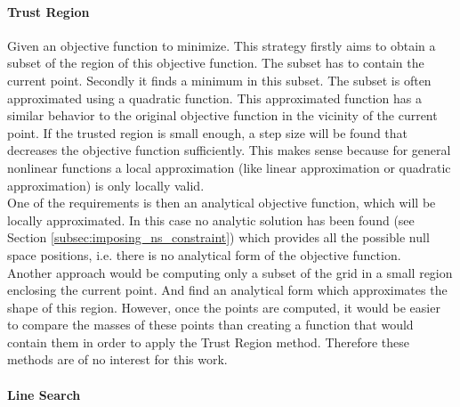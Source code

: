 \paragraph{Trust Region}
\label{subsec:tregion}

Given an objective function to minimize. This  strategy firstly aims to obtain a subset of the region of this objective function. The subset has to contain the current point. Secondly it finds a minimum in this subset. The subset is often approximated using a quadratic function. This approximated function has a similar behavior to the original objective function in the vicinity of the current point. If the trusted region is small enough, a step size will be found that decreases the objective function sufficiently. This makes sense because for general nonlinear functions a local approximation (like linear approximation or quadratic approximation)  is only locally valid. \\ 
%
One of the requirements is then an analytical objective function, which will be locally approximated. In this case no analytic solution has been found (see Section \ref{subsec:imposing_ns_constraint}) which  provides all the possible null space positions, i.e. there is no analytical form of the objective function.\\
%
%
Another approach would be computing only a subset of the grid in a small region enclosing the current point. And find an analytical form which approximates the shape of this region. However, once the points are computed, it would be easier to compare the masses of these points than creating a function that would contain them in order to apply the Trust Region method. Therefore these methods are of no interest for this work.





\paragraph{Line Search}
\label{subsec:lsearch}



